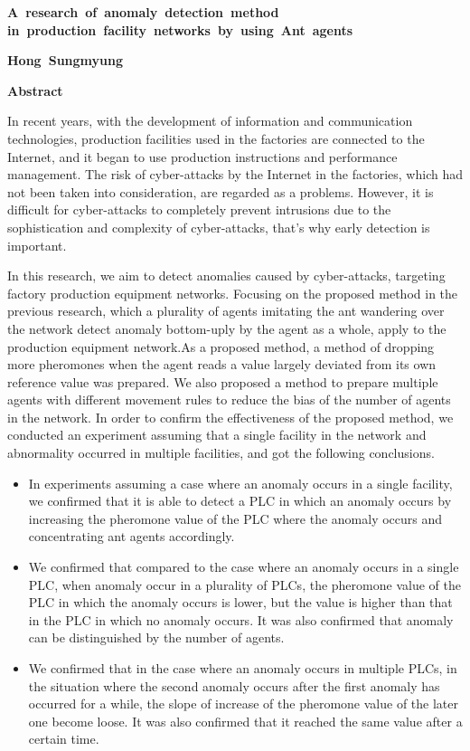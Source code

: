\newpage
\thispagestyle{empty}
\begin{center}
\mbox{\LARGE{\bf{A research of anomaly detection method}}}
\mbox{\LARGE{\bf{in production facility networks by using Ant agents}}}

\vspace*{2mm}
\mbox{\Large{\bf{Hong Sungmyung}}}

\vspace*{7mm}
{\LARGE\bf Abstract}
\end{center}

In recent years, with the development of information and communication technologies, production facilities used in the factories are connected to the Internet, and it began to use production instructions and performance management. The risk of cyber-attacks by the Internet in the factories, which had not been taken into consideration, are regarded as a problems. However, it is difficult for cyber-attacks to completely prevent intrusions due to the sophistication and complexity of cyber-attacks, that's why early detection is important.

In this research, we aim to detect anomalies caused by cyber-attacks, targeting factory production equipment networks. Focusing on the proposed method in the previous research, which a plurality of agents imitating the ant wandering over the network detect anomaly bottom-uply by the agent as a whole, apply to the production equipment network.As a proposed method, a method of dropping more pheromones when the agent reads a value largely deviated from its own reference value was prepared. We also proposed a method to prepare multiple agents with different movement rules to reduce the bias of the number of agents in the network. In order to confirm the effectiveness of the proposed method, we conducted an experiment assuming that a single facility in the network and abnormality occurred in multiple facilities, and got the following conclusions.

\begin{itemize}
\item In experiments assuming a case where an anomaly occurs in a single facility, we confirmed that it is able to detect a PLC in which an anomaly occurs by increasing the pheromone value of the PLC where the anomaly occurs and concentrating ant agents accordingly.

\item We confirmed that compared to the case where an anomaly occurs in a single PLC, when anomaly occur in a plurality of PLCs, the pheromone value of the PLC in which the anomaly occurs is lower, but the value is higher than that in the PLC in which no anomaly occurs. It was also confirmed that anomaly can be distinguished by the number of agents.

\item We confirmed that in the case where an anomaly occurs in multiple PLCs, in the situation where the second anomaly occurs after the first anomaly has occurred for a while, the slope of increase of the pheromone value of the later one become loose. It was also confirmed that it reached the same value after a certain time. 
\end{itemize}
